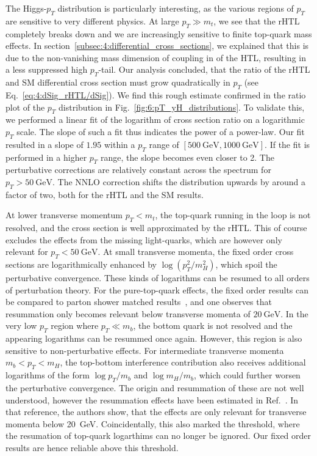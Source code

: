 The Higgs-$p_T$ distribution is particularly interesting, as the various regions of $p_T$ are sensitive to very different physics. At large $p_T \gg m_t$, we see that the \acs{rHTL} completely breaks down and we are increasingly sensitive to finite top-quark mass effects. In section~\ref{subsec:4:differential_cross_sections}, we explained that this is due to the non-vanishing mass dimension of coupling in of the \acs{HTL}, resulting in a less suppressed high $p_T$-tail. Our analysis concluded, that the ratio of the \acs{rHTL} and \acs{SM} differential cross section must grow quadratically in $p_T$ (see Eq.~\eqref{eq:4:dSig_rHTL/dSig}). We find this rough estimate confirmed in the ratio plot of the $p_T$ distribution in Fig.~\ref{fig:6:pT_yH_distributions}. To validate this, we performed a linear fit of the logarithm of cross section ratio on a logarithmic $p_T$ scale. The slope of such a fit thus indicates the power of a power-law. Our fit resulted in a slope of $1.95$ within a $p_T$ range of $[500\ \mathrm{GeV}, 1000\ \mathrm{GeV}]$. If the fit is performed in a higher $p_T$ range, the slope becomes even closer to 2. The perturbative corrections are relatively constant across the spectrum for $p_T > 50\ \mathrm{GeV}$. The \acs{NNLO} correction shifts the distribution upwards by around a factor of two, both for the \acs{rHTL} and the \acs{SM} results.

At lower transverse momentum $p_T < m_t$, the top-quark running in the loop is not resolved, and the cross section is well approximated by the \acs{rHTL}. This of course excludes the effects from the missing light-quarks, which are however only relevant for $p_T < 50\ \mathrm{GeV}$. At small transverse momenta, the fixed order cross sections are logarithmically enhanced by $\log (p_T^2/m_H^2)$, which spoil the perturbative convergence. These kinds of logarithms can be resumed to all orders of perturbation theory. For the pure-top-quark effects, the fixed order results can be compared to parton shower matched results~\cite{Niggetiedt:2024nmp}, and one observes that resummation only becomes relevant below transverse momenta of $20\ \mathrm{GeV}$. In the very low $p_T$ region where $p_T \ll m_b$, the bottom quark is not resolved and the appearing logarithms can be resummed once again. However, this region is also sensitive to non-perturbative effects. For intermediate transverse momenta  $m_b < p_T < m_H$, the top-bottom interference contribution also receives additional logarithms of the form $\log p_T/m_b$ and $\log m_H/m_b$, which could further worsen the perturbative convergence. The origin and resummation of these are not well understood, however the resummation effects have been estimated in Ref.~\cite{Caola:2018zye}. In that reference, the authors show, that the effects are only relevant for transverse momenta below 20~GeV. Coincidentally, this also marked the threshold, where the resumation of top-quark logarthims can no longer be ignored. Our fixed order results are hence reliable above this threshold.

